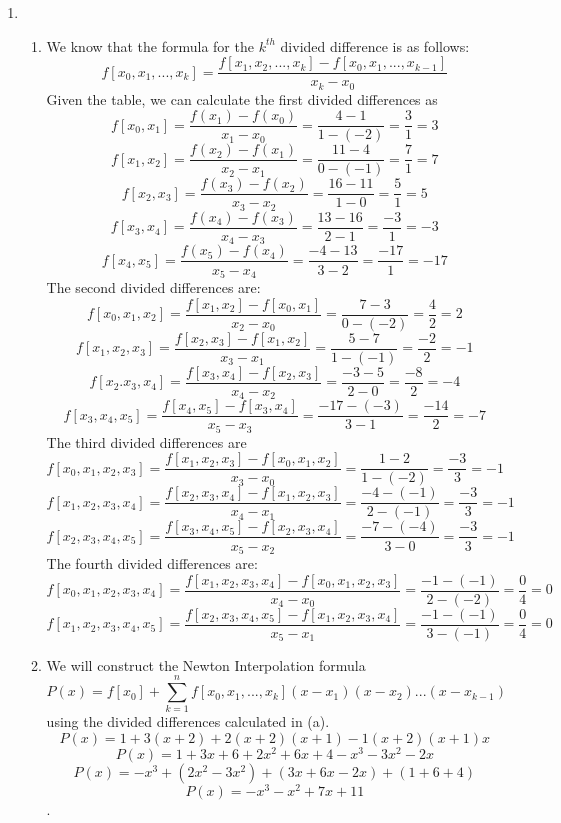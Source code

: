 \documentclass[12pt]{article}
\begin{document}
\begin{enumerate}[leftmargin=2em]
    \item
    \begin{enumerate}
        \item We know that the formula for the $k^{th}$ divided difference is as follows:
        \[f[x_{0},x_{1}, ..., x_{k}] = \frac{f[x_{1}, x_{2},...,x_{k}]-f[x_{0}, x_{1},...,x_{k-1}]}{x_{k}-x_{0}}\]
        Given the table, we can calculate the first divided differences as
        \[f[x_{0}, x_{1}] = \frac{f(x_{1})-f(x_0)}{x_1-x_0} = \frac{4-1}{1-(-2)} = \frac{3}{1} = 3\] 
        \[f[x_{1}, x_{2}] = \frac{f(x_{2}) - f(x_{1})}{x_{2}-x_{1}} = \frac{11-4}{0-(-1)} = \frac{7}{1} = 7\]
        \[f[x_{2}, x_{3}] = \frac{f(x_{3})-f(x_{2})}{x_{3}-x_{2}} = \frac{16-11}{1-0} = \frac{5}{1} = 5\]
        \[f[x_{3}, x_{4}] = \frac{f(x_{4})-f(x_{3})}{x_{4}-x_{3}} = \frac{13-16}{2-1} = \frac{-3}{1} = -3\]
        \[f[x_{4}, x_{5}] = \frac{f(x_{5})-f(x_{4})}{x_{5}-x_{4}} = \frac{-4-13}{3-2} = \frac{-17}{1} = -17\]
        The second divided differences are:
        \[f[x_{0}, x_{1}, x_{2}] = \frac{f[x_{1}, x_{2}] - f[x_{0}, x_{1}]}{x_{2}-x_{0}} = \frac{7-3}{0-(-2)} = \frac{4}{2} = 2\]
        \[f[x_{1}, x_{2}, x_{3}] = \frac{f[x_{2}, x_{3}] - f[x_{1}, x_{2}]}{x_{3}-x_{1}} = \frac{5-7}{1-(-1)} = \frac{-2}{2} = -1\]
        \[f[x_{2}. x_{3}, x_{4}] = \frac{f[x_{3}, x_{4}] - f[x_{2}, x_{3}]}{x_{4}-x_{2}} = \frac{-3-5}{2-0} = \frac{-8}{2} = -4\]
        \[f[x_{3}, x_{4}, x_{5}] = \frac{f[x_{4}, x_{5}] - f[x_{3}, x_{4}]}{x_{5} - x_{3}} = \frac{-17-(-3)}{3-1} = \frac{-14}{2} = -7\]
        The third divided differences are
        \[f[x_{0}, x_{1}, x_{2}, x_{3}] = \frac{f[x_{1}, x_{2}, x_{3}] - f[x_{0}, x_{1}, x_{2}]}{x_{3}-x_{0}} = \frac{1-2}{1-(-2)} = \frac{-3}{3} = -1\]
        \[f[x_{1}, x_{2}, x_{3}, x_{4}] = \frac{f[x_{2}, x_{3}, x_{4}] - f[x_{1}, x_{2}, x_{3}]}{x_{4}-x_{1}} = \frac{-4-(-1)}{2-(-1)} = \frac{-3}{3} = -1\]
        \[f[x_{2}, x_{3}, x_{4}, x_{5}] = \frac{f[x_{3}, x_{4}, x_{5}] - f[x_{2}, x_{3}, x_{4}]}{x_{5}-x_{2}} = \frac{-7-(-4)}{3-0} = \frac{-3}{3} = -1\]
        The fourth divided differences are:
        \[f[x_{0}, x_{1}, x_{2}, x_{3}, x_{4}] = \frac{f[x_{1}, x_{2}, x_{3}, x_{4}] - f[x_{0}, x_{1}, x_{2}, x_{3}]}{x_{4}-x_{0}} = \frac{-1-(-1)}{2-(-2)} = \frac{0}{4} = 0\]
        \[f[x_{1}, x_{2}, x_{3}, x_{4}, x_{5}] = \frac{f[x_{2}, x_{3}, x_{4}, x_{5}] - f[x_{1}, x_{2}, x_{3}, x_{4}]}{x_{5}-x_{1}} = \frac{-1-(-1)}{3-(-1)} = \frac{0}{4} = 0\]

        \item We will construct the Newton Interpolation formula
        \[ P(x) = f[x_{0}] + \sum_{k=1}^{n}f[x_{0}, x_{1}, ..., x_{k}](x-x_{1})(x-x_{2})... (x-x_{k-1})\]
        using the divided differences calculated in (a).
        \[P(x) = 1 + 3(x+2) + 2(x+2)(x+1) - 1(x+2)(x+1)x\]
        \[P(x) = 1 + 3x + 6 + 2x^{2}+6x + 4 - x^3 - 3x^2 - 2x\]
        \[P(x) = -x^3+(2x^2-3x^2)+ (3x+6x-2x)+(1+6+4)\]
        \[P(x) = -x^3-x^2+7x+11\].
    \end{enumerate}


\end{enumerate}
\end{document}
